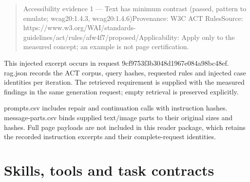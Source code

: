 \documentclass[acmsmall,screen,nonacm]{acmart}
\begin{document}
\begin{quote}\footnotesize\ttfamily\raggedright\sloppy Accessibility evidence 1 — Text has minimum contrast (passed, pattern to emulate; wcag20:1.4.3, wcag20:1.4.6)\newline Provenance: W3C ACT Rules\newline Source: https://www.w3.org/WAI/standards-guidelines/act/rules/afw4f7/proposed/\newline Applicability: Apply only to the measured concept; an example is not page certification.\end{quote}
This injected excerpt occurs in request 9cf9753f3b3048d1967e084a98bc48ef. rag.json records the ACT corpus, query hashes, requested rules and injected case identities per iteration. The retrieved requirement is supplied with the measured findings in the same generation request; empty retrieval is preserved explicitly.

prompts.csv includes repair and continuation calls with instruction hashes. message-parts.csv binds supplied text/image parts to their original sizes and hashes. Full page payloads are not included in this reader package, which retains the recorded instruction excerpts and their complete-request identities.

\clearpage
\section{Skills, tools and task contracts}
\end{document}
